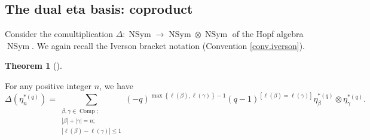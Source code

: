 \documentclass[numbers=enddot,12pt,final,onecolumn,notitlepage]{scrartcl}%
\theoremstyle{definition}
\newtheorem{theo}{Theorem}[section]
\newenvironment{theorem}[1][]
{\begin{theo}[#1]\begin{leftbar}}
{\end{leftbar}\end{theo}}
\let\sumnonlimits\sum
\renewcommand{\sum}{\sumnonlimits\limits}
\begin{document}
\subsection{The dual eta basis: coproduct}

Consider the comultiplication $\Delta:\operatorname*{NSym}\rightarrow
\operatorname*{NSym}\otimes\operatorname*{NSym}$ of the Hopf algebra
$\operatorname*{NSym}$. We again recall the Iverson bracket notation
(Convention \ref{conv.iverson}).

\begin{theorem}
\label{thm.Deltaetastara}For any positive integer $n$, we have%
\[
\Delta\left(  \eta_{n}^{\ast\left(  q\right)  }\right)  =\sum_{\substack{\beta
,\gamma\in\operatorname*{Comp};\\\left\vert \beta\right\vert +\left\vert
\gamma\right\vert =n;\\\left\vert \ell\left(  \beta\right)  -\ell\left(
\gamma\right)  \right\vert \leq1}}\left(  -q\right)  ^{\max\left\{
\ell\left(  \beta\right)  ,\ell\left(  \gamma\right)  \right\}  -1}\left(
q-1\right)  ^{\left[  \ell\left(  \beta\right)  =\ell\left(  \gamma\right)
\right]  }\eta_{\beta}^{\ast\left(  q\right)  }\otimes\eta_{\gamma}%
^{\ast\left(  q\right)  }.
\]

\end{theorem}
\end{document}
